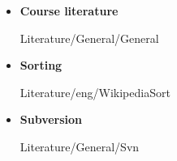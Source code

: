 \begin{frame}{\LectureFurtherLiterature}
  \begin{itemize}
    \item
    \textbf{Course literature}
    \begin{btSect}{Literature/General/General}
      \btPrintAll
    \end{btSect}
  \end{itemize}
\end{frame}


\begin{frame}{\LectureFurtherLiterature}
  \begin{itemize}
    \item
      \textbf{Sorting}
      \begin{btSect}{Literature/eng/WikipediaSort}
        \btPrintAll
      \end{btSect}
  \end{itemize}
\end{frame}




\begin{frame}{\LectureFurtherLiterature}
  \begin{itemize}
    \item
    \textbf{Subversion}
    \begin{btSect}{Literature/General/Svn}
      \btPrintAll
    \end{btSect}
  \end{itemize}
\end{frame}
